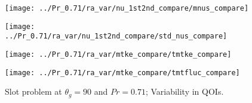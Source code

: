 \begin{figure}[h!]
    \begin{minipage}[b]{.25\linewidth}
   \centering 
   \texttt{[image: ../Pr\_0.71/ra\_var/nu\_1st2nd\_compare/mnus\_compare]}
    \end{minipage}%
    \begin{minipage}[b]{.25\linewidth}
   \centering 
   \texttt{[image: ../Pr\_0.71/ra\_var/nu\_1st2nd\_compare/std\_nus\_compare]}
    \end{minipage}%
    \begin{minipage}[b]{.25\linewidth}
   \centering 
   \texttt{[image: ../Pr\_0.71/ra\_var/mtke\_compare/tmtke\_compare]}
    \end{minipage}%
    \begin{minipage}[b]{.25\linewidth}
   \centering 
   \texttt{[image: ../Pr\_0.71/ra\_var/mtke\_compare/tmtfluc\_compare]}
    \end{minipage}%
   \caption{Slot problem at $\theta_g=90$ and $Pr=0.71$; Variability in QOIs.}
\label{fig:slot_pr_7.2_fom_mean} \end{figure}

